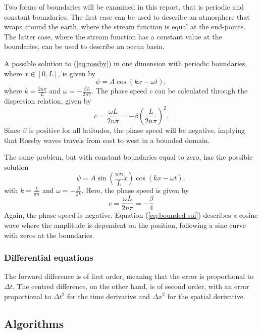 Two forms of boundaries will be examined in this report, that is periodic and constant boundaries. The first case can be used to describe an atmosphere that wraps around the earth, where the stream function is equal at the end-points. The latter case, where the stream function has a constant value at the boundaries, can be used to describe an ocean basin.  

A possible solution to (\ref{eq:rossby}) in one dimension with periodic boundaries, where $x \in \left[0,L \right] $, is given by 
\begin{equation}\label{eq:periodic sol}
	\psi = A\cos{\left(kx-\omega t\right)},
\end{equation}
where $k=\frac{2n\pi}{L}$ and $\omega = - \frac{\beta L}{2n\pi}$. The phase speed $c$ can be calculated through the dispersion relation, given by
\begin{equation}
	c = \frac{\omega L}{2n\pi}=-\beta \left(\frac{L}{2n\pi}\right)^2.
\end{equation}
Since $\beta$ is positive for all latitudes, the phase speed will be negative, implying that Rossby waves travels from east to west in a bounded domain. 

The same problem, but with constant boundaries equal to zero, has the possible solution 
\begin{equation}\label{eq:bounded sol}
	\psi = A\sin\left(\frac{\pi n}{L}x\right)\cos\left(kx-\omega t\right),
\end{equation}
with $k = \frac{L}{\pi n}$ and $\omega = - \frac{\beta}{2k}$. Here, the phase speed is given by 
\begin{equation}
	c = \frac{\omega L}{2n\pi} = - \frac{\beta}{4}
\end{equation}
Again, the phase speed is negative. Equation (\ref{eq:bounded sol}) describes a cosine wave where the amplitude is dependent on the position, following a sine curve with zeros at the boundaries.

\subsubsection{Differential equations}
The forward difference is of first order, meaning that the error is proportional to $\Delta t$. The centred difference, on the other hand, is of second order, with an error proportional to $\Delta t^2$ for the time derivative and $\Delta x^2$ for the spatial derivative.     

\subsection{Algorithms}
\label{sec:algo}
